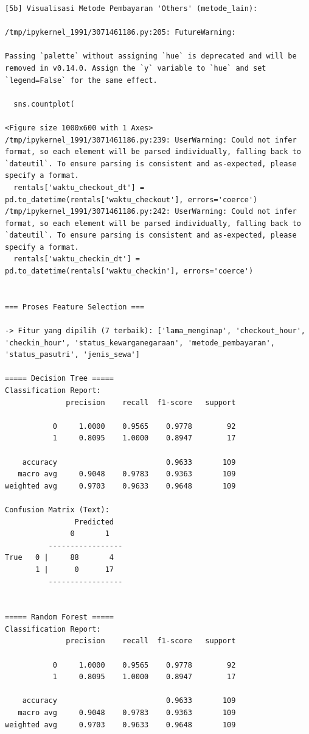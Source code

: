 \begin{lstlisting}[caption={Output 15}]
[5b] Visualisasi Metode Pembayaran 'Others' (metode_lain):

/tmp/ipykernel_1991/3071461186.py:205: FutureWarning: 

Passing `palette` without assigning `hue` is deprecated and will be removed in v0.14.0. Assign the `y` variable to `hue` and set `legend=False` for the same effect.

  sns.countplot(

<Figure size 1000x600 with 1 Axes>
/tmp/ipykernel_1991/3071461186.py:239: UserWarning: Could not infer format, so each element will be parsed individually, falling back to `dateutil`. To ensure parsing is consistent and as-expected, please specify a format.
  rentals['waktu_checkout_dt'] = pd.to_datetime(rentals['waktu_checkout'], errors='coerce')
/tmp/ipykernel_1991/3071461186.py:242: UserWarning: Could not infer format, so each element will be parsed individually, falling back to `dateutil`. To ensure parsing is consistent and as-expected, please specify a format.
  rentals['waktu_checkin_dt'] = pd.to_datetime(rentals['waktu_checkin'], errors='coerce')


=== Proses Feature Selection ===

-> Fitur yang dipilih (7 terbaik): ['lama_menginap', 'checkout_hour', 'checkin_hour', 'status_kewarganegaraan', 'metode_pembayaran', 'status_pasutri', 'jenis_sewa']

===== Decision Tree =====
Classification Report:
              precision    recall  f1-score   support

           0     1.0000    0.9565    0.9778        92
           1     0.8095    1.0000    0.8947        17

    accuracy                         0.9633       109
   macro avg     0.9048    0.9783    0.9363       109
weighted avg     0.9703    0.9633    0.9648       109

Confusion Matrix (Text):
                Predicted
               0       1
          -----------------
True   0 |     88       4
       1 |      0      17
          -----------------


===== Random Forest =====
Classification Report:
              precision    recall  f1-score   support

           0     1.0000    0.9565    0.9778        92
           1     0.8095    1.0000    0.8947        17

    accuracy                         0.9633       109
   macro avg     0.9048    0.9783    0.9363       109
weighted avg     0.9703    0.9633    0.9648       109


\end{lstlisting}
